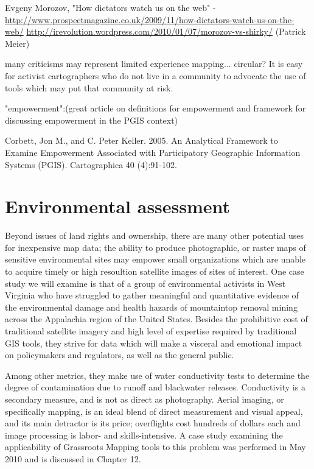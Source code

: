 \documentclass[11pt]{report}
\begin{document}
Evgeny Morozov, "How dictators watch us on the web" - \url{http://www.prospectmagazine.co.uk/2009/11/how-dictators-watch-us-on-the-web/}
\url{http://irevolution.wordpress.com/2010/01/07/morozov-vs-shirky/} (Patrick Meier)

many criticisms may represent limited experience mapping... circular?
It is easy for activist cartographers who do not live in a community to advocate the use of tools which may put that community at risk.

"empowerment":(great article on definitions for empowerment and framework for discussing empowerment in the PGIS context)

Corbett, Jon M., and C. Peter Keller. 2005. An Analytical Framework to Examine Empowerment Associated with Participatory Geographic Information Systems (PGIS). Cartographica 40 (4):91-102.

\section{Environmental assessment}

Beyond issues of land rights and ownership, there are many other potential uses for inexpensive map data; the ability to produce photographic, or raster maps of sensitive environmental sites may empower small organizations which are unable to acquire timely or high resoultion satellite images of sites of interest. One case study we will examine is that of a group of environmental activists in West Virginia who have struggled to gather meaningful and quantitative evidence of the environmental damage and health hazards of mountaintop removal mining across the Appalachia region of the United States. Besides the prohibitive cost of traditional satellite imagery and high level of expertise required by traditional GIS tools, they strive for data which will make a visceral and emotional impact on policymakers and regulators, as well as the general public. 

Among other metrics, they make use of water conductivity tests to determine the degree of contamination due to runoff and blackwater releases. Conductivity is a secondary measure, and is not as direct as photography. Aerial imaging, or specifically mapping, is an ideal blend of direct measurement and visual appeal, and its main detractor is its price; overflights cost hundreds of dollars each and image processing is labor- and skills-intensive. A case study examining the applicability of Grassroots Mapping tools to this problem was performed in May 2010 and is discussed in Chapter 12.
\end{document}
